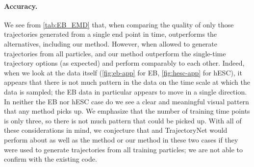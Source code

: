 \paragraph{Accuracy.} We see from \cref{tab:EB_EMD} that, when comparing the quality of only those trajectories generated from a single end point in time, \dmsbname{} outperforms the alternatives, including our method. However, when allowed to generate trajectories from all particles, \vanilla{} and our method outperform the single-time trajectory options (as expected) and perform comparably to each other. Indeed, when we look at the data itself (\cref{fig:eb-app} for EB, \cref{fig:hesc-app} for hESC), it appears that there is not much pattern in the data on the time scale at which the data is sampled; the EB data in particular appears to move in a single direction. In neither the EB nor hESC case do we see a clear and meaningful visual pattern that any method picks up. We emphasize that the number of training time points is only three, so there is not much pattern that could be picked up. With all of these considerations in mind, we conjecture that \dmsbname{} and TrajectoryNet would perform about as well as the \vanilla{} method or our method in these two cases if they were used to generate trajectories from all training particles; we are not able to confirm with the existing code.

